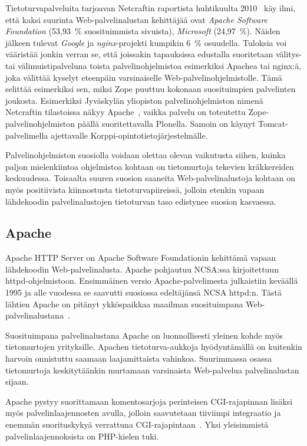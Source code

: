 Tietoturvapalveluita tarjoavan Netcraftin raportista
huhtikuulta 2010~\cite{netcraft} käy ilmi, että kaksi suurinta
Web-palvelinalustan kehittäjää ovat \textit{Apache Software Foundation} (53,93~\% suosituimmista
sivuista), \textit{Microsoft} (24,97~\%). Näiden jälkeen tulevat
\textit{Google} ja \textit{nginx}-projekti kumpikin 6~\% osuudella.
Tuloksia voi vääristää jonkin verran se, että joissakin tapauksissa
edustalla suoritetaan välitys- tai välimuistipalveluna toista
palvelinohjelmistoa esimerkiksi Apachea tai nginx:ä, joka välittää
kyselyt eteenpäin varsinaiselle
Web-\-palvelinohjelmistolle. Tämä selittää esimerkiksi
sen, miksi Zope puuttuu kokonaan suosituimpien palvelinten
joukosta. Esimerkiksi Jyväskylän yliopiston palvelinohjelmiston nimenä
Netcraftin tilastoissa näkyy Apache~\cite{netcraft_jyu}, vaikka
palvelu on toteutettu Zope-\-palvelinohjelmiston päällä
suoritettavalla Plonella. Samoin on käynyt Tomcat-\-palvelimella
ajettavalle Korppi-\-opintotietojärjestelmälle.

Palvelinohjelmiston suosiolla voidaan olettaa olevan vaikutusta
siihen, kuinka paljon mielenkiintoa ohjelmistoa kohtaan on
tietomurtoja tekevien kräkkereiden keskuudessa. Toisaalta
suuren suosion saaneita Web-palvelinalustoja kohtaan on myös
positiivista kiinnostusta tietoturvapiireissä, jolloin etenkin vapaan
lähdekoodin palvelinalustojen tietoturvan taso edistynee suosion
kasvaessa.

\subsection{Apache}

Apache HTTP Server on Apache Software Foundationin kehittämä vapaan
lähdekoodin Web-palvelinalusta. Apache pohjautuu NCSA:ssa
kirjoitettuun httpd-\-ohjelmistoon. Ensimmäinen versio
Apache-palvelimesta julkaistiin keväällä 1995 ja alle vuodessa se
saavutti suosiossa edeltäjänsä NCSA httpd:n. Tästä lähtien Apache on 
pitänyt ykköspaikkaa maailman suosituimpana Web-palvelinalustana~\cite{apache}.

Suosituimpana palvelinalustana Apache on luonnollisesti yleinen kohde
myös tietomurtojen yrityksille. Apachen tietoturva-aukkoja
hyödyntämällä on kuitenkin harvoin onnistuttu saamaan laajamittaista
vahinkoa. Suurimmassa osassa tietomurtoja keskitytäänkin murtamaan
varsinaista Web-palvelua palvelinalustan
sijaan.  %

Apache pystyy suorittamaan komentosarjoja perinteisen CGI-rajapinnan
lisäksi myös palvelinlaajennosten avulla, jolloin saavutetaan
tiiviimpi integraatio ja enemmän suorituskykyä verrattuna
CGI-rajapintaan~\cite{cginopeus}. Yksi yleisimmistä
palvelinlaajennoksista on PHP-kielen tuki.

